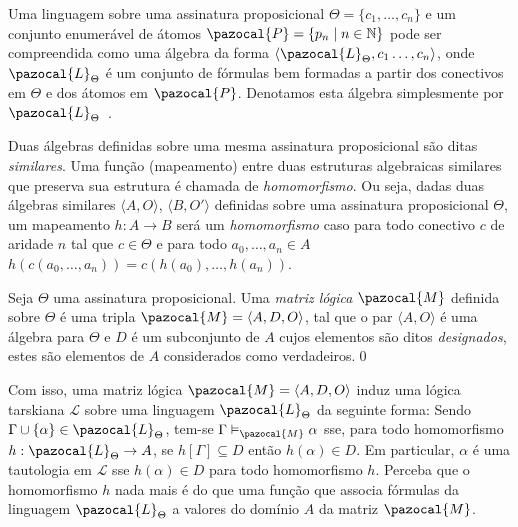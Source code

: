         \begin{observacao}
            Uma linguagem sobre uma assinatura proposicional $\Theta = \{c_{1}, \ldots, c_{n}\}$ e um conjunto enumerável de átomos $\pazocal{P} = \{p_{n} \; | \; n \in \mathbb{N} \}$ pode ser compreendida como uma álgebra da forma $\langle \pazocal{L}_{\Theta}, c_{1}\ldots, c_{n} \rangle$, onde $\pazocal{L}_{\Theta}$ é um conjunto de fórmulas bem formadas a partir dos conectivos em $\Theta$ e dos átomos em $\pazocal{P}$. Denotamos esta álgebra simplesmente por $\pazocal{L}_{\Theta}$~\cite{Sikorski1966-SIKAOF,Wojcicki1984-WJCLOP}.
        \end{observacao}

        Duas álgebras definidas sobre uma mesma assinatura proposicional são ditas \textit{similares}. Uma função (mapeamento) entre duas estruturas algebraicas similares que preserva sua estrutura é chamada de \textit{homomorfismo}. Ou seja, dadas duas álgebras similares $\langle A, O \rangle$, $\langle B, O' \rangle$ definidas sobre uma assinatura proposicional $\Theta$, um mapeamento $h : A \to B$ será um \textit{homomorfismo} caso para todo conectivo $c$ de aridade $n$ tal que $c \in \Theta$ e para todo $a_{0},\ldots,a_{n} \in A$ $h(c(a_{0},\ldots, a_{n})) = c(h(a_{0}),\ldots, h(a_{n}))$.

        \begin{definicao}
            Seja $\Theta$ uma assinatura proposicional. Uma \textit{matriz lógica} $\pazocal{M}$ definida sobre $\Theta$ é uma tripla $\pazocal{M} = \langle A, D, O \rangle$, tal que o par $\langle A, O \rangle$ é uma álgebra para $\Theta$ e $D$ é um subconjunto de $A$ cujos elementos são ditos \textit{designados}, estes são elementos de $A$ considerados como verdadeiros.\qed{}
        \end{definicao}

        Com isso, uma matriz lógica $\pazocal{M} = \langle A, D, O \rangle$ induz uma lógica tarskiana $\mathcal{L}$ sobre uma linguagem $\pazocal{L}_{\Theta}$ da seguinte forma: Sendo $\Gamma \cup \{\alpha\} \in \pazocal{L}_{\Theta}$, tem-se $\Gamma \vDash_{\pazocal{M}} \alpha$ sse, para todo homomorfismo $h : \pazocal{L}_{\Theta} \to A$, se $h[\Gamma] \subseteq D$ então $h(\alpha) \in D$. Em particular, $\alpha$ é uma tautologia em $\mathcal{L}$ sse $h(\alpha) \in D$ para todo homomorfismo $h$. Perceba que o homomorfismo $h$ nada mais é do que uma função que associa fórmulas da linguagem $\pazocal{L}_{\Theta}$ a valores do domínio $A$ da matriz $\pazocal{M}$.

